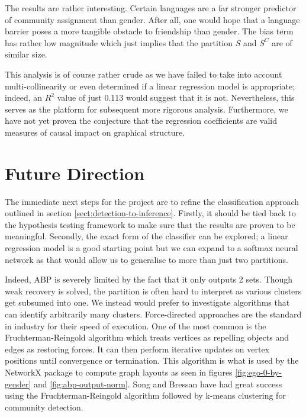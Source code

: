 \documentclass[11pt]{article}
\begin{document}
\begin{multicols*}{2}
The results are rather interesting. Certain languages are a far stronger predictor of community assignment than gender. After all, one would hope that a language barrier poses a more tangible obstacle to friendship than gender. The bias term has rather low magnitude which just implies that the partition $S$ and $S^C$ are of similar size.

This analysis is of course rather crude as we have failed to take into account multi-collinearity or even determined if a linear regression model is appropriate; indeed, an $R^2$ value of just 0.113 would suggest that it is not. Nevertheless, this serves as the platform for subsequent more rigorous analysis. Furthermore, we have not yet proven the conjecture that the regression coefficients are valid measures of causal impact on graphical structure.

\section{Future Direction}

The immediate next steps for the project are to refine the classification approach outlined in section \ref{sect:detection-to-inference}. Firstly, it should be tied back to the hypothesis testing framework to make sure that the results are proven to be meaningful. Secondly, the exact form of the classifier can be explored; a linear regression model is a good starting point but we can expand to a softmax neural network as that would allow us to generalise to more than just two partitions.

Indeed, ABP is severely limited by the fact that it only outputs 2 sets. Though weak recovery is solved, the partition is often hard to interpret as various clusters get subsumed into one. We instead would prefer to investigate algorithms that can identify arbitrarily many clusters. Force-directed approaches are the standard in industry for their speed of execution. One of the most common is the Fruchterman-Reingold algorithm which treats vertices as repelling objects and edges as restoring forces. It can then perform iterative updates on vertex positions until convergence or termination. This algorithm is what is used by the NetworkX package \cite{networkx} to compute graph layouts as seen in figures \ref{fig:ego-0-by-gender} and \ref{fig:abp-output-norm}. Song and Bressan \cite{force-directed} have had great success using the Fruchterman-Reingold algorithm followed by k-means clustering for community detection.


\end{multicols*}
\end{document}
